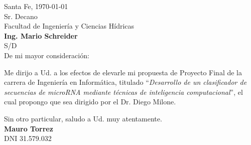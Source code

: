 \documentclass[a4paper,11pt,oneside]{article}
\begin{document}

Santa Fe, \today\\[2em]
%
Sr. Decano\\
Facultad de Ingeniería y Ciencias Hídricas\\
{\bfseries Ing. Mario Schreider}\\
S/D\\[2em]
%
De mi mayor consideración:

Me dirijo a Ud. a los efectos de elevarle mi propuesta de Proyecto
Final de la carrera de Ingeniería en Informática, titulado
``\emph{Desarrollo de un clasificador de secuencias de
 microRNA mediante técnicas de inteligencia computacional}'', el cual
propongo que sea dirigido por el Dr. Diego Milone.

Sin otro particular, saludo a Ud. muy atentamente.\\[8em]

{\bfseries Mauro Torrez}\\
DNI 31.579.032
%
\end{document}
